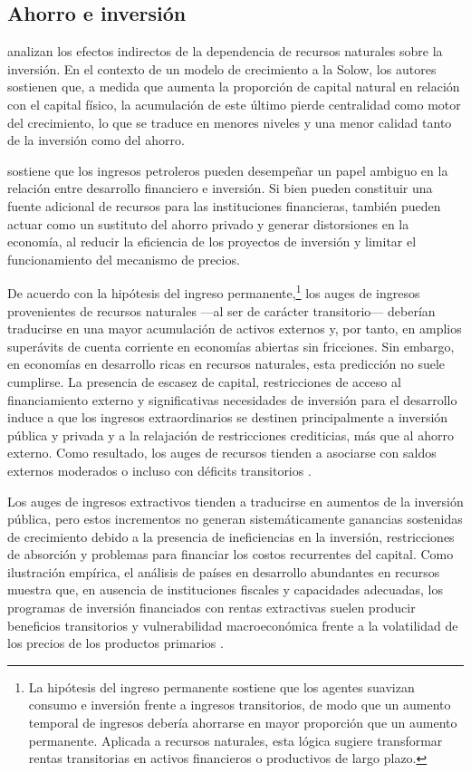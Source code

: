 \documentclass[../../PTFM.tex]{subfiles}
\begin{document}
	\subsection{Ahorro e inversión}
	\label{subsec:ahorro-inversion}
	
	\textcite{Gylfason2006} analizan los efectos indirectos de la dependencia de recursos naturales sobre la inversión. En el contexto de un modelo de crecimiento a la Solow, los autores sostienen que, a medida que aumenta la proporción de capital natural en relación con el capital físico, la acumulación de este último pierde centralidad como motor del crecimiento, lo que se traduce en menores niveles y una menor calidad tanto de la inversión como del ahorro.
	
	\textcite{Nili2007} sostiene que los ingresos petroleros pueden desempeñar un papel ambiguo en la relación entre desarrollo financiero e inversión. Si bien pueden constituir una fuente adicional de recursos para las instituciones financieras, también pueden actuar como un sustituto del ahorro privado y generar distorsiones en la economía, al reducir la eficiencia de los proyectos de inversión y limitar el funcionamiento del mecanismo de precios.
	
	De acuerdo con la hipótesis del ingreso permanente,\footnote{La hipótesis del ingreso permanente sostiene que los agentes suavizan consumo e inversión frente a ingresos transitorios, de modo que un aumento temporal de ingresos debería ahorrarse en mayor proporción que un aumento permanente. Aplicada a recursos naturales, esta lógica sugiere transformar rentas transitorias en activos financieros o productivos de largo plazo.} los auges de ingresos provenientes de recursos naturales —al ser de carácter transitorio— deberían traducirse en una mayor acumulación de activos externos y, por tanto, en amplios superávits de cuenta corriente en economías abiertas sin fricciones. Sin embargo, en economías en desarrollo ricas en recursos naturales, esta predicción no suele cumplirse. La presencia de escasez de capital, restricciones de acceso al financiamiento externo y significativas necesidades de inversión para el desarrollo induce a que los ingresos extraordinarios se destinen principalmente a inversión pública y privada y a la relajación de restricciones crediticias, más que al ahorro externo. Como resultado, los auges de recursos tienden a asociarse con saldos externos moderados o incluso con déficits transitorios \parencite{Araujo2016}.
	
	Los auges de ingresos extractivos tienden a traducirse en aumentos de la inversión pública, pero estos incrementos no generan sistemáticamente ganancias sostenidas de crecimiento debido a la presencia de ineficiencias en la inversión, restricciones de absorción y problemas para financiar los costos recurrentes del capital. Como ilustración empírica, el análisis de países en desarrollo abundantes en recursos muestra que, en ausencia de instituciones fiscales y capacidades adecuadas, los programas de inversión financiados con rentas extractivas suelen producir beneficios transitorios y vulnerabilidad macroeconómica frente a la volatilidad de los precios de los productos primarios \parencite{Berg2013}.
	
\end{document}
